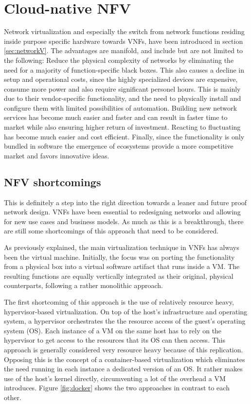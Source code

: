 \section{Cloud-native NFV}
Network virtualization and especially the switch from network functions residing inside purpose specific hardware towards VNFs, have been introduced in section \ref{sec:networkV}. The advantages are manifold, and include but are not limited to the following: Reduce the physical complexity of networks by eliminating the need for a majority of function-specific black boxes. This also causes a decline in setup and operational costs, since the highly specialized devices are expensive, consume more power and also require significant personel hours. This is mainly due to their vendor-specific functionality, and the need to physically install and configure them with limited possibilities of automation. Building new network services has become much easier and faster and can result in faster time to market while also ensuring higher return of investment. Reacting to fluctuating has become much easier and cost efficient. Finally, since the functionality is only bundled in software the emergence of ecosystems provide a more competitive market and favors innovative ideas. 

\subsection{NFV shortcomings}
This is definitely a step into the right direction towards a leaner and future proof network design. VNFs have been essential to redesigning networks and allowing for new use cases and business models. As much as this is a breakthrough, there are still some shortcomings of this approach that need to be considered. 

As previously explained, the main virtualization technique in VNFs has always been the virtual machine. Initially, the focus was on porting the functionality from a physical box into a virtual software artifact that runs inside a VM. The resulting functions are equally vertically integrated as their original, physical counterparts, following a rather monolithic approach. 

The first shortcoming of this approach is the use of relatively resource heavy, hypervisor-based virtualization. On top of the host's infrastructure and operating system, a hypervisor orchestrates the the resource access of the guest's operating system (OS). Each instance of a VM on the same host has to rely on the hypervisor to get access to the resources that its OS can then access. This approach is generally considered very resource heavy because of this replication. Opposing this is the concept of a container-based virtualization which eliminates the need running in each instance a dedicated version of an OS. It rather makes use of the host's kernel directly, circumventing a lot of the overhead a VM introduces. Figure \ref{fig:docker} shows the two approaches in contrast to each other.


